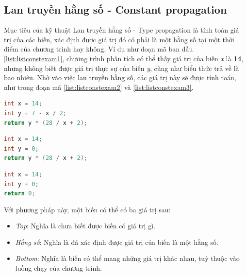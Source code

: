 \subsection{Lan truyền hằng số - Constant propagation}
\label{sec:constantprop}
Mục tiêu của kỹ thuật Lan truyền hằng số - Type propagation \cite{constantpropagation} là tính toán giá trị của các biến, xác định được giá trị đó có phải là một hằng số tại một thời điểm của chương trình hay không. Ví dụ như đoạn mã ban đầu \ref{list:listconstexam1}, chương trình phân tích có thể thấy giá trị của biến \textit{x} là \textbf{14}, nhưng không biết được giá trị thực sự của biến \textit{y}, cũng như biểu thức trả về là bao nhiêu. Nhờ vào việc lan truyền hằng số, các giá trị này sẽ được tính toán, như trong đoạn mã \ref{list:listconstexam2} và \ref{list:listconstexam3}.
\begin{lstlisting}[caption={Đoạn mã trước khi thực hiện lan truyền hằng số},label={list:listconstexam1}, language=c++]
int x = 14;
int y = 7 - x / 2;
return y * (28 / x + 2);
\end{lstlisting}
\begin{lstlisting}[caption={Đoạn mã sau khi thực hiện lan truyền hằng số cho biến y},label={list:listconstexam2}, language=c++]
int x = 14;
int y = 0;
return y * (28 / x + 2);
\end{lstlisting}
\begin{lstlisting}[caption={Đoạn mã sau khi thực hiện lan truyền hằng số cho biểu thức trả về},label={list:listconstexam3}, language=c++]
int x = 14;
int y = 0;
return 0;
\end{lstlisting}
Với phương pháp này, một biến có thể có ba giá trị sau:
\begin{itemize}
	\item \textit{Top}: Nghĩa là chưa biết được biến có giá trị gì.
	\item \textit{Hằng số}: Nghĩa là đã xác định được giá trị của biến là một hằng số.
	\item \textit{Bottom}: Nghĩa là biến có thể mang những giá trị khác nhau, tuỳ thuộc vào luồng chạy của chương trình.
\end{itemize}

